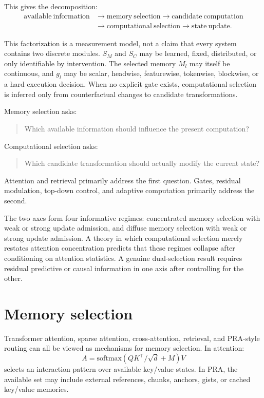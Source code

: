 \documentclass[10pt]{article}
\begin{document}
This gives the decomposition:
\[
\begin{aligned}
\boxed{\mathrm{available\ information}}
&\rightarrow \boxed{\mathrm{memory\ selection}}
\rightarrow \boxed{\mathrm{candidate\ computation}}\\
&\rightarrow \boxed{\mathrm{computational\ selection}}
\rightarrow \boxed{\mathrm{state\ update}}.
\end{aligned}
\]

This factorization is a measurement model, not a claim that every system contains two discrete modules. $S_M$ and $S_C$ may be learned, fixed, distributed, or only identifiable by intervention. The selected memory $M_l$ may itself be continuous, and $g_l$ may be scalar, headwise, featurewise, tokenwise, blockwise, or a hard execution decision. When no explicit gate exists, computational selection is inferred only from counterfactual changes to candidate transformations.

Memory selection asks:
\begin{quote}
Which available information should influence the present computation?
\end{quote}
Computational selection asks:
\begin{quote}
Which candidate transformation should actually modify the current state?
\end{quote}

Attention and retrieval primarily address the first question. Gates, residual modulation, top-down control, and adaptive computation primarily address the second.

The two axes form four informative regimes: concentrated memory selection with weak or strong update admission, and diffuse memory selection with weak or strong update admission. A theory in which computational selection merely restates attention concentration predicts that these regimes collapse after conditioning on attention statistics. A genuine dual-selection result requires residual predictive or causal information in one axis after controlling for the other.

\section{Memory selection}
Transformer attention, sparse attention, cross-attention, retrieval, and PRA-style routing can all be viewed as mechanisms for memory selection. In attention:
\[
A=\mathrm{softmax}(QK^\top/\sqrt{d}+M)V
\]
selects an interaction pattern over available key/value states. In PRA, the available set may include external references, chunks, anchors, gists, or cached key/value memories.
\end{document}

